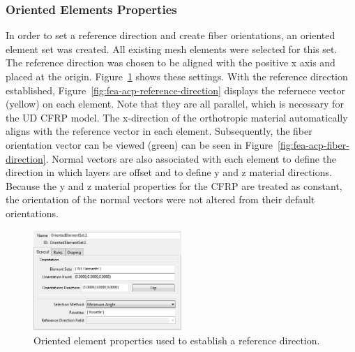 \clearpage

\subsubsection{Oriented Elements Properties}

\indent

In order to set a reference direction and create fiber orientations, an oriented element set was created. All existing mesh elements were selected for this set. The reference direction was chosen to be aligned with the positive x axis and placed at the origin. Figure~\ref{fig:fea-acp-oriented-element-properties} shows these settings. With the reference direction established, Figure~\ref{fig:fea-acp-reference-direction} displays the refernece vector (yellow) on each element. Note that they are all parallel, which is necessary for the UD CFRP model. The x-direction of the orthotropic material automatically aligns with the reference vector in each element. Subsequently, the fiber orientation vector can be viewed (green) can be seen in Figure~\ref{fig:fea-acp-fiber-direction}. Normal vectors are also associated with each element to define the direction in which layers are offset and to define y and z material directions. Because the y and z material properties for the CFRP are treated as constant, the orientation of the normal vectors were not altered from their default orientations.\\

\begin{figure}[htp]
\centering
\includegraphics[width=0.5\textwidth]{./figures/fea/fea-acp-oriented-element-properties}
\caption{Oriented element properties used to establish a reference direction.}
\label{fig:fea-acp-oriented-element-properties}
\end{figure}

